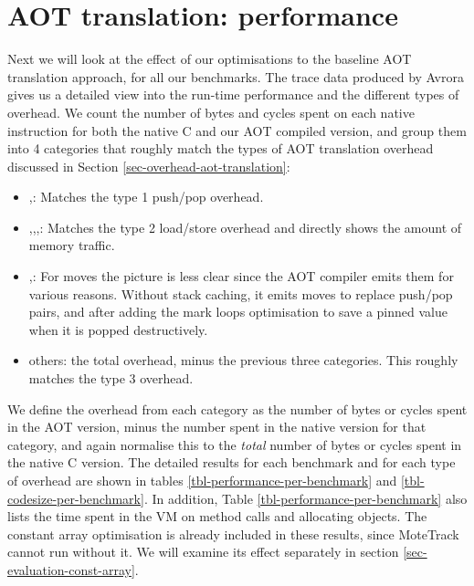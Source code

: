


\section{AOT translation: performance}
\label{sec-evaluation-aot-translation-performance}

Next we will look at the effect of our optimisations to the baseline AOT translation approach, for all our benchmarks. The trace data produced by Avrora gives us a detailed view into the run-time performance and the different types of overhead. We count the number of bytes and cycles spent on each native instruction for both the native C and our AOT compiled version, and group them into 4 categories that roughly match the types of AOT translation overhead discussed in Section \ref{sec-overhead-aot-translation}:
\begin{itemize}
	\item {},: Matches the type 1 push/pop overhead.
	\item {},,,: Matches the type 2 load/store overhead and directly shows the amount of memory traffic.
	\item {},: For moves the picture is less clear since the AOT compiler emits them for various reasons. Without stack caching, it emits moves to replace push/pop pairs, and after adding the mark loops optimisation to save a pinned value when it is popped destructively.
	\item others: the total overhead, minus the previous three categories. This roughly matches the type 3 overhead.
\end{itemize}

We define the overhead from each category as the number of bytes or cycles spent in the AOT version, minus the number spent in the native version for that category, and again normalise this to the \emph{total} number of bytes or cycles spent in the native C version. The detailed results for each benchmark and for each type of overhead are shown in tables \ref{tbl-performance-per-benchmark} and \ref{tbl-codesize-per-benchmark}. In addition, Table \ref{tbl-performance-per-benchmark} also lists the time spent in the VM on method calls and allocating objects. The constant array optimisation is already included in these results, since MoteTrack cannot run without it. We will examine its effect separately in section \ref{sec-evaluation-const-array}.

